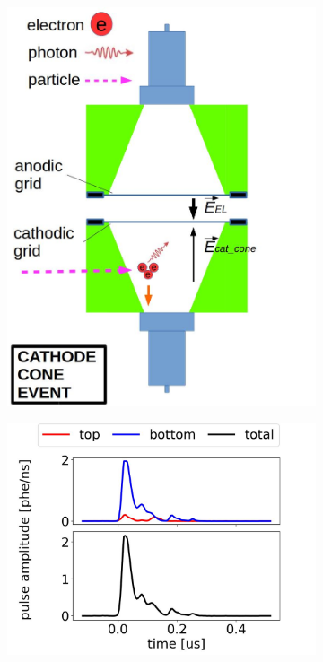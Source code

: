 \begin{figure}[!htbp]
	\centering
	\begin{subfigure}[b]{0.8\textwidth}
		\centering
		\includegraphics[width=\halfwidth,clip,trim={0 0 0 0},angle=0,origin=c]{Figures/GasTest/WeiDrawEvent/BelowCat.jpg}
		\caption{}
		\label{fig:}
	\end{subfigure}
	\par\bigskip
	\begin{subfigure}[b]{0.7\textwidth}
		\centering
		\includegraphics[width=\figurewidth,clip,trim={0 0 0 0}]{Figures/GasTest/exampleWaveforms/proc64767id00000021.jpg}%

\end{subfigure}
\end{figure}

